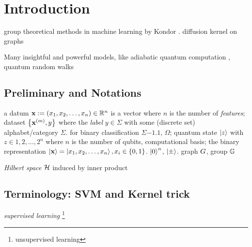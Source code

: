 
\section{Introduction}

group theoretical methods in machine learning by Kondor \cite{kondorGroupTheoreticalMethods2008}.
diffusion kernel on graphs \cite{kondorDiffusionKernelsGraphs2002}

Many insightful and powerful models, like adiabatic quantum computation \cite{farhiQuantumComputationAdiabatic2000}, quantum random walks \cite{childsQuantumInformationProcessing2004} 

\subsection{Preliminary and Notations}
a datum $\vb{x}:= (x_1,x_2,\dots,x_n) \in \mathbb{R}^n$ is a vector where $n$ is the number of \emph{features};
dataset $\qty{\vb{x}^{(m)}, y}$ where the \emph{label} $y\in\Sigma$ with some (discrete set) alphabet/category $\Sigma$. for binary classification $\Sigma\qty{-1,1}$,
$\Omega$;
quantum state $\ket{z}$ with $z\in {1,2,\dots,2^n}$ where $n$ is the number of qubits,
computational basis; 
the binary representation $\ket{\vb{x}}=\ket{x_1,x_2,\dots,x_n},x_i\in \qty{0,1}$.
$\ket{0}^n$, $\ket{\pm}$.
graph $G$, group $\mathbb{G}$
\begin{definition}\label{def:hilbert_space}
	\emph{Hilbert space} $\mathcal{H}$ induced by inner product
\end{definition}

\subsection{Terminology: SVM and Kernel trick}\label{sec:svm}
\emph{supervised learning} 
\footnote{unsupervised learning}
